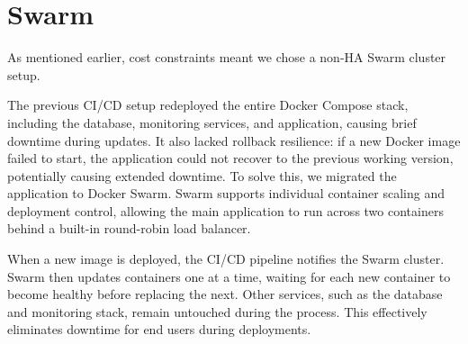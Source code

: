 \section{Swarm}
As mentioned earlier, cost constraints meant we chose a non-HA Swarm cluster setup.

The previous CI/CD setup redeployed the entire Docker Compose stack, including the database, monitoring services, and application, causing brief downtime during updates. It also lacked rollback resilience: if a new Docker image failed to start, the application could not recover to the previous working version, potentially causing extended downtime.
To solve this, we migrated the application to Docker Swarm. Swarm supports individual container scaling and deployment control, allowing the main application to run across two containers behind a built-in round-robin load balancer.

When a new image is deployed, the CI/CD pipeline notifies the Swarm cluster. Swarm then updates containers one at a time, waiting for each new container to become healthy before replacing the next. Other services, such as the database and monitoring stack, remain untouched during the process. This effectively eliminates downtime for end users during deployments.

